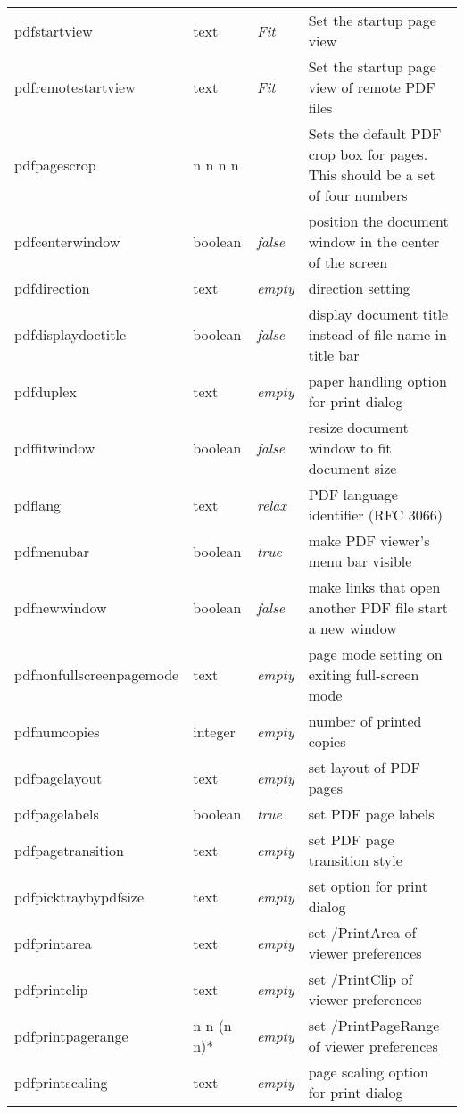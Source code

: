 \documentclass[pdftex]{article}
\begin{document}
\begin{longtable}{@{}>{\ttfamily}l>{\raggedright}p{}>{\itshape}lp{7cm}@{}}
pdfstartview       & text    & Fit   & Set the startup page view \\
pdfremotestartview & text    & Fit   & Set the startup page view of remote PDF files \\
pdfpagescrop       & n n n n &       & Sets the default PDF crop box for pages. This should be a set of four numbers \\
pdfcenterwindow    & boolean & false & position the document window in the center of the screen \\
pdfdirection       & text    & empty & direction setting \\
pdfdisplaydoctitle & boolean & false & display document title instead of
                                       file name in title bar\\
pdfduplex          & text    & empty & paper handling option for print dialog\\
pdffitwindow       & boolean & false & resize document window to fit document size \\
pdflang            & text    & relax & PDF language identifier (RFC 3066)\\
pdfmenubar         & boolean & true  & make PDF viewer's menu bar visible \\
pdfnewwindow       & boolean & false & make links that open another PDF file start a new window \\
pdfnonfullscreenpagemode
                   & text & empty & page mode setting on exiting
                                       full-screen mode\\
pdfnumcopies       & integer & empty & number of printed copies \\
pdfpagelayout      & text    & empty & set layout of PDF pages \\
pdfpagelabels      & boolean & true  & set PDF page labels \\
pdfpagetransition  & text    & empty & set PDF page transition style \\
pdfpicktraybypdfsize & text & empty & set option for print dialog \\
pdfprintarea       & text    & empty & set /PrintArea of viewer preferences \\
pdfprintclip       & text    & empty & set /PrintClip of viewer preferences \\
pdfprintpagerange  & n n (n n)*
                             & empty & set /PrintPageRange of viewer
                                       preferences\\
pdfprintscaling    & text    & empty & page scaling option for print dialog

\end{longtable}
\end{document}
